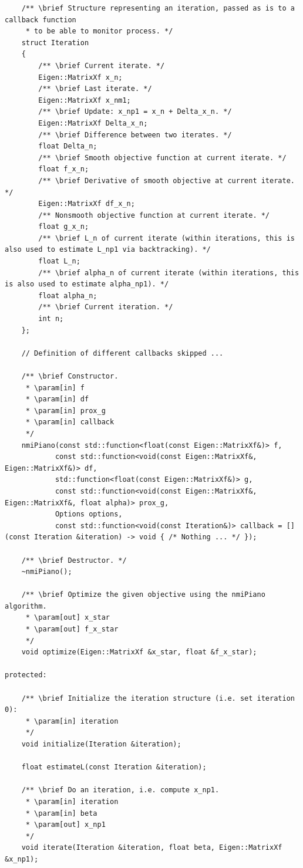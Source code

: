 \documentclass[onecolumn,final,a4paper,13pt,reqno]{siamart}
\begin{document}
\begin{appendix}
\begin{lstlisting}
    /** \brief Structure representing an iteration, passed as is to a callback function
     * to be able to monitor process. */
    struct Iteration
    {
        /** \brief Current iterate. */
        Eigen::MatrixXf x_n;
        /** \brief Last iterate. */
        Eigen::MatrixXf x_nm1;
        /** \brief Update: x_np1 = x_n + Delta_x_n. */
        Eigen::MatrixXf Delta_x_n;
        /** \brief Difference between two iterates. */
        float Delta_n;
        /** \brief Smooth objective function at current iterate. */
        float f_x_n;
        /** \brief Derivative of smooth objective at current iterate. */
        Eigen::MatrixXf df_x_n;
        /** Nonsmooth objective function at current iterate. */
        float g_x_n;
        /** \brief L_n of current iterate (within iterations, this is also used to estimate L_np1 via backtracking). */
        float L_n;
        /** \brief alpha_n of current iterate (within iterations, this is also used to estimate alpha_np1). */
        float alpha_n;
        /** \brief Current iteration. */
        int n;
    };
    
    // Definition of different callbacks skipped ...
    
    /** \brief Constructor.
     * \param[in] f
     * \param[in] df
     * \param[in] prox_g
     * \param[in] callback
     */
    nmiPiano(const std::function<float(const Eigen::MatrixXf&)> f, 
            const std::function<void(const Eigen::MatrixXf&, Eigen::MatrixXf&)> df,
            std::function<float(const Eigen::MatrixXf&)> g,
            const std::function<void(const Eigen::MatrixXf&, Eigen::MatrixXf&, float alpha)> prox_g,
            Options options,
            const std::function<void(const Iteration&)> callback = [](const Iteration &iteration) -> void { /* Nothing ... */ });
            
    /** \brief Destructor. */
    ~nmiPiano();
    
    /** \brief Optimize the given objective using the nmiPiano algorithm. 
     * \param[out] x_star
     * \param[out] f_x_star
     */
    void optimize(Eigen::MatrixXf &x_star, float &f_x_star);
    
protected:
    
    /** \brief Initialize the iteration structure (i.e. set iteration 0): 
     * \param[in] iteration
     */
    void initialize(Iteration &iteration);
    
    float estimateL(const Iteration &iteration);
    
    /** \brief Do an iteration, i.e. compute x_np1.
     * \param[in] iteration
     * \param[in] beta
     * \param[out] x_np1
     */
    void iterate(Iteration &iteration, float beta, Eigen::MatrixXf &x_np1);
    

\end{lstlisting}
\end{appendix}
\end{document}
